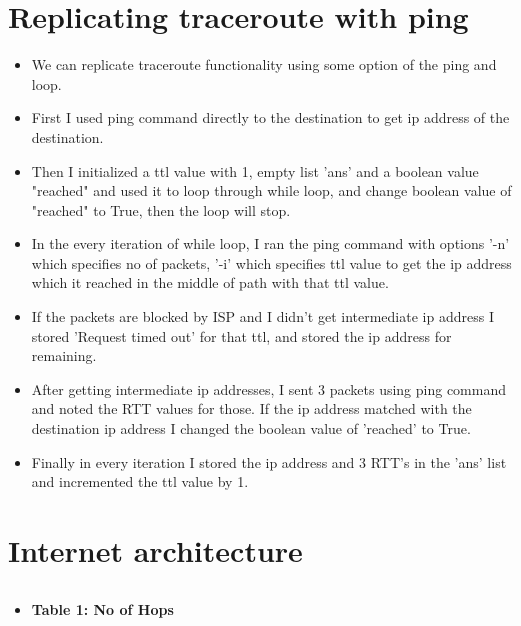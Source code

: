 \documentclass{article}
\begin{document}
\section{Replicating traceroute with ping}
\begin{itemize} 

\item We can replicate traceroute functionality using some option of the ping and loop.
\item First I used ping command directly to the destination to get ip address of the destination.
\item Then I initialized a ttl value with 1, empty list 'ans' and a boolean value "reached" and used it to loop through while loop, and change boolean value of "reached" to True, then the loop will stop.
\item In the every iteration of while loop, I ran the ping command with options '-n' which specifies no of packets, '-i' which specifies ttl value to get the ip address which it reached in the middle of path with that ttl value. 
\item If the packets are blocked by ISP and I didn't get intermediate ip address I stored 'Request timed out' for that ttl, and stored the ip address for remaining.
\item After getting intermediate ip addresses, I sent 3 packets using ping command and noted the RTT values for those. If the ip address matched with the destination ip address I changed the boolean value of 'reached' to True.
\item Finally in every iteration I stored the ip address and 3 RTT's in the 'ans' list and incremented the ttl value by 1.



\end{itemize}

\section{Internet architecture}


\subsection{}
\begin{itemize}
    \item \textbf{Table 1: No of Hops}
\end{itemize}
\end{document}
